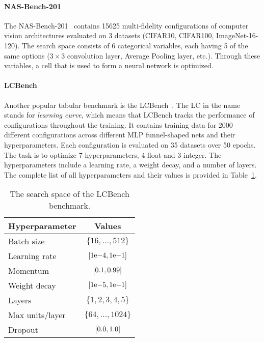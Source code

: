 

\paragraph{NAS-Bench-201}
The NAS-Bench-201~\cite{dong2020nasbench201} contains 15625 multi-fidelity configurations of computer vision architectures evaluated on 3 datasets (CIFAR10, CIFAR100, ImageNet-16-120). The search space consists of 6 categorical variables, each having 5 of the same options ($3\times3$ convolution layer, Average Pooling layer, etc.). Through these variables, a cell that is used to form a neural network is optimized.

\paragraph{LCBench}
Another popular tabular benchmark is the LCBench~\cite{ZimLin2021a}. The LC in the name stands for \textit{learning curve}, which means that LCBench tracks the performance of configurations throughout the training. It contains training data for 2000 different configurations across different MLP funnel-shaped nets and their hyperparameters. Each configuration is evaluated on 35 datasets over 50 epochs. The task is to optimize 7 hyperparameters, 4 float and 3 integer. The hyperparameters include a learning rate, a weight decay, and a number of layers. The complete list of all hyperparameters and their values is provided in Table~\ref{tab:lc}.

\begin{table}
    \begin{tabular}{lc}
        \toprule
        Hyperparameter & Values \\
        \midrule
        Batch size & $\{16,\ldots , 512\}$ \\
        Learning rate & $\interval{1\mathrm{e}{-4}}{1\mathrm{e}{-1}}$ \\
        Momentum & $\interval{0.1}{0.99}$ \\
        Weight decay & $\interval{1\mathrm{e}{-5}}{1\mathrm{e}{-1}}$ \\
        Layers & $\{1,2,3,4,5\}$ \\
        Max units/layer & $\{64, \ldots , 1024\}$ \\
        Dropout & $\interval{0.0}{1.0}$ \\
        \bottomrule
        \end{tabular}
        \caption{The search space of the LCBench benchmark.}
        \label{tab:lc}
    \end{table}

